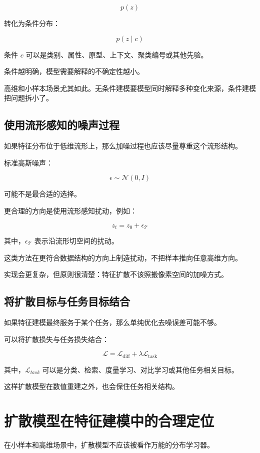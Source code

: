 \[
p(z)
\]

转化为条件分布：

\[
p(z \mid c)
\]

条件 \(c\) 可以是类别、属性、原型、上下文、聚类编号或其他先验。

条件越明确，模型需要解释的不确定性越小。

高维和小样本场景尤其如此。无条件建模要模型同时解释多种变化来源，条件建模把问题拆小了。

\subsection{使用流形感知的噪声过程}

如果特征分布位于低维流形上，那么加噪过程也应该尽量尊重这个流形结构。

标准高斯噪声：

\[
\epsilon \sim \mathcal{N}(0,I)
\]

可能不是最合适的选择。

更合理的方向是使用流形感知扰动，例如：

\[
z_t = z_0 + \epsilon_{\mathcal{T}}
\]

其中，\(\epsilon_{\mathcal{T}}\) 表示沿流形切空间的扰动。

这类方法在更符合数据结构的方向上制造扰动，不把样本推向任意高维方向。

实现会更复杂，但原则很清楚：特征扩散不该照搬像素空间的加噪方式。

\subsection{将扩散目标与任务目标结合}

如果特征建模最终服务于某个任务，那么单纯优化去噪误差可能不够。

可以将扩散损失与任务损失结合：

\[
\mathcal{L}
=
\mathcal{L}_{\text{diff}}
+
\lambda \mathcal{L}_{\text{task}}
\]

其中，\(\mathcal{L}_{task}\) 可以是分类、检索、度量学习、对比学习或其他任务相关目标。

这样扩散模型在数值重建之外，也会保住任务相关结构。

\section{扩散模型在特征建模中的合理定位}

在小样本和高维场景中，扩散模型不应该被看作万能的分布学习器。

